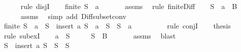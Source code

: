 \begin{isabellebody}
\ \ \ \ \isamarkupfalse%
\ {\isacharparenleft}rule\ disjI{}{\isacharparenright}\isanewline
\ \ \isamarkupfalse%
\ {}{\isacharcolon}{\isachardoublequoteopen}finite\ {\isacharparenleft}S\ {\isacharminus}\ {\isacharbraceleft}a{\isacharbraceright}{\isacharparenright}{\isachardoublequoteclose}\ \isanewline
\ \ \ \ \isamarkupfalse%
\ assms{\isacharparenleft}{}{\isacharparenright}\ \isamarkupfalse%
\ {\isacharparenleft}rule\ finite{\isacharunderscore}Diff{\isacharparenright}\isanewline
\ \ \isamarkupfalse%
\ {}{\isacharcolon}{\isachardoublequoteopen}{\isacharparenleft}S\ {\isacharminus}\ {\isacharbraceleft}a{\isacharbraceright}{\isacharparenright}\ {\isasymsubseteq}\ B{\isachardoublequoteclose}\ \isanewline
\ \ \ \ \isamarkupfalse%
\ assms{\isacharparenleft}{}{\isacharparenright}\ \isamarkupfalse%
\ {\isacharparenleft}simp\ add{\isacharcolon}\ Diff{\isacharunderscore}subset{\isacharunderscore}conv{\isacharparenright}\isanewline
\ \ \isamarkupfalse%
\ {\isachardoublequoteopen}finite\ {\isacharparenleft}S\ {\isacharminus}\ {\isacharbraceleft}a{\isacharbraceright}{\isacharparenright}\ {\isasymand}\ {\isacharparenleft}S\ {\isacharequal}\ insert\ a\ {\isacharparenleft}S\ {\isacharminus}\ {\isacharbraceleft}a{\isacharbraceright}{\isacharparenright}\ {\isasymor}\ S\ {\isacharequal}\ S\ {\isacharminus}\ {\isacharbraceleft}a{\isacharbraceright}{\isacharparenright}{\isachardoublequoteclose}\isanewline
\ \ \ \ \isamarkupfalse%
\ {}\ {}\ \isamarkupfalse%
\ {\isacharparenleft}rule\ conjI{\isacharparenright}\isanewline
\ \ \isamarkupfalse%
\ {\isacharquery}thesis\ \isamarkupfalse%
\ {}\ \isamarkupfalse%
\ {\isacharparenleft}rule\ subexI{\isacharparenright}\isanewline
{}\isamarkupfalse%
\isanewline
\ \ \isamarkupfalse%
\ {\isachardoublequoteopen}a\ {\isasymnotin}\ S{\isachardoublequoteclose}\isanewline
\ \ \isamarkupfalse%
\ \isamarkupfalse%
\ {}{\isacharcolon}{\isachardoublequoteopen}S\ {\isasymsubseteq}\ B{\isachardoublequoteclose}\ \isanewline
\ \ \ \ \isamarkupfalse%
\ assms{\isacharparenleft}{}{\isacharparenright}\ \isamarkupfalse%
\ blast\ \isanewline
\ \ \isamarkupfalse%
\ {}{\isacharcolon}{\isachardoublequoteopen}S\ {\isacharequal}\ insert\ a\ S\ {\isasymor}\ S\ {\isacharequal}\ S{\isachardoublequoteclose}\isanewline

\end{isabellebody}

